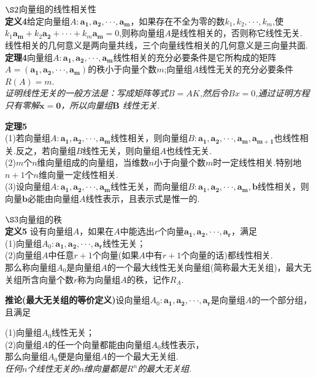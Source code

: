 \documentclass[UTF8]{ctexart}
\begin{document}
\\ \\ $\S2$\quad 向量组的线性相关性
\\ \textbf{定义4}\quad 给定向量组$A:\bm{a_1},\bm{a_2},\cdot\cdot\cdot,\bm{a_m}$，如果存在不全为零的数$k_1,k_2,\cdot\cdot\cdot,k_m$,使$k_1\bm{a_m}+k_2\bm{a_2}+\cdot\cdot\cdot+k_m\bm{a_m}=0$,则称向量组$A$是线性相关的，否则称它线性无关.
\\ 线性相关的几何意义是两向量共线，三个向量线性相关的几何意义是三向量共面.
\\ \textbf{定理4}\quad 向量组$A:\bm{a_1},\bm{a_2},\cdot\cdot\cdot,\bm{a_m}$线性相关的充分必要条件是它所构成的矩阵$A=(\bm{a_1},\bm{a_2},\cdot\cdot\cdot,\bm{a_m})$的秩小于向量个数$m$;向量组$A$线性无关的充分必要条件$R(A)=m$.
\\ \emph{证明线性无关的一般方法是：写成矩阵等式$B=AK$,然后令$Bx=0$,通过证明方程只有零解$\bm{x}=\bm{0}$，所以向量组$\bm{B}$ 线性无关.}

\noindent \textbf{定理5}\quad
\\(1)若向量组$A:\bm{a_1},\bm{a_2},\cdot\cdot\cdot,\bm{a_m}$线性相关，则向量组$   B:\bm{a_1},\bm{a_2},\cdot\cdot\cdot,\bm{a_m},\bm{a_{m+1}}$也线性相关.反之，若向量组$B$线性无关，则向量组$A$也线性无关.
\\ (2)$m$个$n$维向量组成的向量组，当维数$n$小于向量个数$m$时一定线性相关.特别地$n+1$个$n$维向量一定线性相关.
\\ (3)设向量组$A:\bm{a_1},\bm{a_2},\cdot\cdot\cdot,\bm{a_m}$线性无关，而向量组$B:\bm{a_1},\bm{a_2},\cdot\cdot\cdot,\bm{a_m},\bm{b}$线性相关，则向量$\bm{b}$必能由向量组$A$线性表示，且表示式是惟一的.

\noindent  $\S3$\quad 向量组的秩
\\ \textbf{定义5} \quad 设有向量组$A$，如果在$A$中能选出$r$个向量$\bm{a_1},\bm{a_2},\cdot\cdot\cdot,\bm{a_r}$，满足
\\ (1)向量组$A_0:\bm{a_1},\bm{a_2},\cdot\cdot\cdot,\bm{a_r}$线性无关；
\\(2)向量组$A$中任意$r+1$个向量(如果$A$中有$r+1$个向量的话)都线性相关.
\\ 那么称向量组$A_0$是向量组$A$的一个最大线性无关向量组(简称最大无关组)，最大无关组所含向量个数$r$称为向量组$A$的秩，记作$R_A$.

\noindent \textbf{推论(最大无关组的等价定义)}\quad 设向量组$A_0:\bm{a_1},\bm{a_2},\cdot\cdot\cdot,\bm{a_r}$是向量组$A$的一个部分组，且满足

\noindent  (1)向量组$A_0$线性无关；
\\ (2)向量组$A$的任一个向量都能由向量组$A_0$线性表示，
\\ 那么向量组$A_0$便是向量组$A$的一个最大无关组.
\\ \emph{任何$n$个线性无关的$n$维向量都是$R^n$的最大无关组.}
\end{document}
